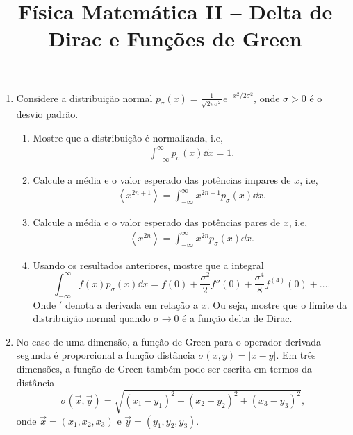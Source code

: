 \newif\ifuseseminar
\useseminartrue


\title{Física Matemática II -- Delta de Dirac e Funções de Green}


\begin{enumerate}
	\item Considere a distribuição normal
	      $p_\sigma(x)=\frac{1}{\sqrt{2\pi\sigma^2}}e^{-x^2/2\sigma^2}$, onde $\sigma>0$
	      é o desvio padrão.
	      \begin{enumerate}
		      \item Mostre que a distribuição é normalizada, i.e,
		            \begin{align}
			            \int_{-\infty}^{\infty}p_\sigma(x)\dd x = 1.
		            \end{align}
		      \item Calcule a média e o valor esperado das potências impares de $x$,
		            i.e,
		            \begin{align}
			            \left\langle x^{2n+1}\right\rangle =
			            \int_{-\infty}^{\infty}x^{2n+1}p_\sigma(x)\dd x.
		            \end{align}
		      \item Calcule a média e o valor esperado das potências pares de $x$,
		            i.e,
		            \begin{align}
			            \left\langle x^{2n}\right\rangle =
			            \int_{-\infty}^{\infty}x^{2n}p_\sigma(x)\dd x.
		            \end{align}
		      \item Usando os resultados anteriores, mostre que a integral
		            $$\int_{-\infty}^{\infty}f(x)p_\sigma(x)\dd x =
			            f(0)+\frac{\sigma^2}{2}f''(0) +
			            \frac{\sigma^4}{8}f^{(4)}(0)+\ldots.$$
		            Onde ${}'$ denota a derivada em relação a $x$.
		            Ou seja, mostre que o limite da distribuição normal quando
		            $\sigma\rightarrow 0$ é a função delta de Dirac.
	      \end{enumerate}
	\item No caso de uma dimensão, a função de Green para o operador derivada
	      segunda é proporcional a função distância $\sigma(x,y) = |x-y|$. Em três
	      dimensões, a função de Green também pode ser escrita em termos da
	      distância $$\sigma(\vec{x},\vec{y}) = \sqrt{(x_1-y_1)^2+(x_2-y_2)^2+(x_3-y_3)^2},$$
	      onde $\vec{x}=(x_1,x_2,x_3)$ e $\vec{y}=(y_1,y_2,y_3)$.
	      \begin{enumerate}

\end{enumerate}
\end{enumerate}
